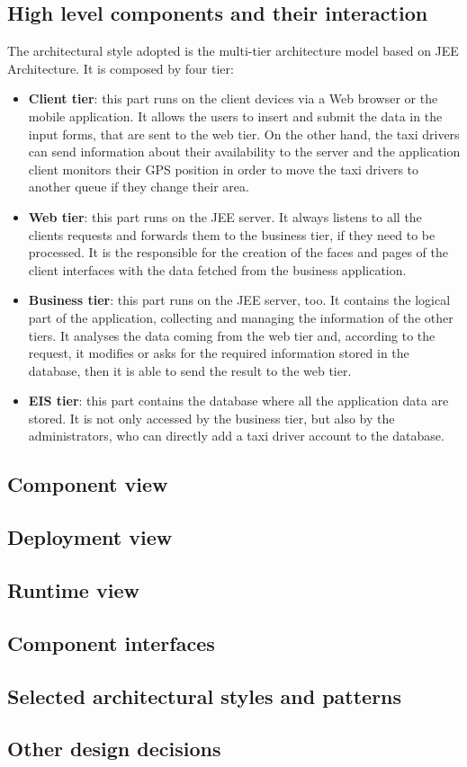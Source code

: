 \documentclass[18pt,oneside,a4paper, titlepage]{article}
\begin{document}
		\subsection{High level components and their interaction}
			The architectural style adopted is the multi-tier architecture model based on JEE Architecture. It is composed by four tier:
			\begin{itemize}
				\item \textbf{Client tier}: this part runs on the client devices via a Web browser or the mobile application. It allows the users to insert and submit the data in the input forms, that are sent to the web tier. On the other hand, the taxi drivers can send information about their availability to the server and the application client monitors their GPS position in order to move the taxi drivers to another queue if they change their area. 
				\item \textbf{Web tier}: this part runs on the JEE server. It always listens to all the clients requests and forwards them to the business tier, if they need to be processed. It is the responsible for the creation of the faces and pages of the client interfaces with the data fetched from the business application.
				\item \textbf{Business tier}: this part runs on the JEE server, too. It contains the logical part of the application, collecting and managing the information of the other tiers. It analyses the data coming from the web tier and, according to the request, it modifies or asks for the required information stored in the database, then it is able to send the result to the web tier.  
				\item \textbf{EIS tier}: this part contains the database where all the application data are stored. It is not only accessed by the business tier, but also by the administrators, who can directly add a taxi driver account to the database. 
			\end{itemize}
		\subsection{Component view}
			
		\subsection{Deployment view}
		\subsection{Runtime view}
		
		\subsection{Component interfaces}
		\subsection{Selected architectural styles and patterns}
			
		\subsection{Other design decisions}
		
\end{document}
